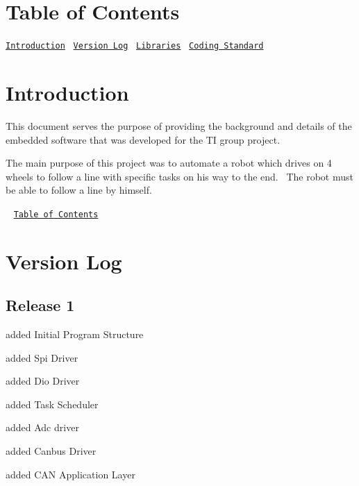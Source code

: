 \label{_Contents}%
 \hypertarget{index_contents_sec}{}\section{Table of Contents}\label{index_contents_sec}
\href{#Introduction}{\tt Introduction}~\newline
 \href{#VersionLog}{\tt Version Log}~\newline
 \href{#Libraries}{\tt Libraries}~\newline
 \href{#CodingStandard}{\tt Coding Standard}~\newline






\label{_Introduction}%
 \hypertarget{index_intro_sec}{}\section{Introduction}\label{index_intro_sec}
This document serves the purpose of providing the background and details of the embedded software that was developed for the TI group project.

The main purpose of this project was to automate a robot which drives on 4 wheels to follow a line with specific tasks on his way to the end.~\newline
 The robot must be able to follow a line by himself.

~\newline
\href{#Contents}{\tt Table of Contents}~\newline






\label{_VersionLog}%
\hypertarget{index_Version}{}\section{Version Log}\label{index_Version}
\hypertarget{index_Release1}{}\subsection{Release 1}\label{index_Release1}

\begin{DoxyItemize}
\item added Initial Program Structure
\item added Spi Driver
\item added Dio Driver
\item added Task Scheduler
\item added Adc driver
\item added Canbus Driver
\item added C\+AN Application Layer
\end{DoxyItemize}

